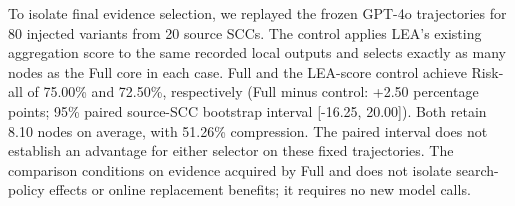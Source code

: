 To isolate final evidence selection, we replayed the frozen GPT-4o trajectories for 80 injected variants from 20 source SCCs. The control applies LEA's existing aggregation score to the same recorded local outputs and selects exactly as many nodes as the Full core in each case. Full and the LEA-score control achieve Risk-all of 75.00\% and 72.50\%, respectively (Full minus control: +2.50 percentage points; 95\% paired source-SCC bootstrap interval [-16.25, 20.00]). Both retain 8.10 nodes on average, with 51.26\% compression. The paired interval does not establish an advantage for either selector on these fixed trajectories. The comparison conditions on evidence acquired by Full and does not isolate search-policy effects or online replacement benefits; it requires no new model calls.
